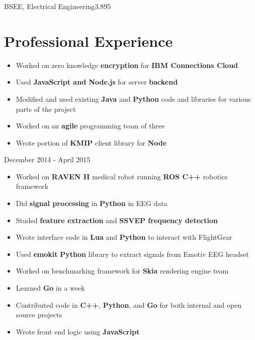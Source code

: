 \documentclass{my_resume}
\begin{document}

	{BSEE, Electrical Engineering}{3.895}

\section{Professional Experience}
\begin{itemize}
	\item Worked on zero knowledge \textbf{encryption} for 
		\textbf{IBM Connections Cloud}
	\item Used \textbf{JavaScript and Node.js} for server \textbf{backend}
	\item Modified and used existing \textbf{Java} and \textbf{Python} code
		and libraries for various parts of the project
	\item Worked on an \textbf{agile} programming team of three
	\item Wrote portion of \textbf{KMIP} client library for \textbf{Node}
\end{itemize}
	{December 2014 - April 2015}
\begin{itemize}
	\item Worked on \textbf{RAVEN II} medical robot running \textbf{ROS C++}
		robotics framework
	\item Did \textbf{signal processing} in \textbf{Python} in EEG data
	\item Studed \textbf{feature extraction} and \textbf{SSVEP frequency detection}
	\item Wrote interface code in \textbf{Lua} and \textbf{Python} to interact
		with FlightGear
	\item Used \textbf{emokit} \textbf{Python} library to extract signals from
		Emotiv EEG headset
\end{itemize}
\begin{itemize}
	\item Worked on benchmarking framework for \textbf{Skia} rendering engine team
	\item Learned \textbf{Go} in a week
	\item Contributed code in \textbf{C++}, \textbf{Python}, and \textbf{Go} for
		both internal and open source projects
	\item Wrote front end logic using \textbf{JavaScript}
\end{itemize}
\end{document}
